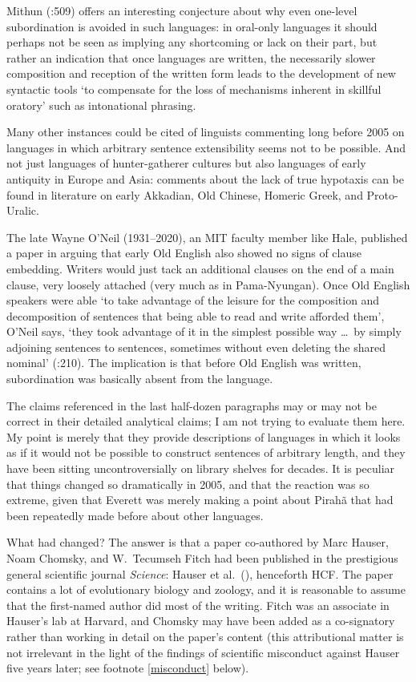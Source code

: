 \documentclass[output=paper,colorlinks,citecolor=brown
]{langscibook}
\begin{document}
Mithun (\citeyear{Mithun84}:509) offers an interesting conjecture
about why even one-level subordination is avoided in such languages:
in oral-only languages it should perhaps not be seen as implying any
shortcoming or lack on their part, but rather an indication that once
languages are written, the necessarily slower composition and reception
of the written form leads to the development of new syntactic tools
`to compensate for the loss of mechanisms inherent in skillful oratory'
such as intonational phrasing.

Many other instances could be cited of linguists commenting long before
2005 on languages in which arbitrary sentence extensibility seems not
to be possible. And not just languages of hunter-gatherer cultures
but also languages of early antiquity in Europe and Asia: comments
about the lack of true hypotaxis can be found in literature on
early Akkadian, Old Chinese, Homeric Greek, and Proto-Uralic.

The late Wayne O'Neil (1931--2020), an MIT faculty member like Hale,
published a paper in \citeyear{ONeil77} arguing that early Old English
also showed no signs of clause embedding. Writers would just tack an
additional clauses on the end of a main clause, very loosely attached
(very much as in Pama-Nyungan). Once Old English speakers were able
`to take advantage of the leisure for the composition and decomposition
of sentences that being able to read and write afforded them', O'Neil
says, `they took advantage of it in the simplest possible way \ldots\
by simply adjoining sentences to sentences, sometimes without even
deleting the shared nominal' (\citealt{ONeil77}:210). The implication
is that before Old English was written, subordination was basically
absent from the language.

The claims referenced in the last half-dozen paragraphs may or may not
be correct in their detailed analytical claims; I am not trying to
evaluate them here. My point is merely that they provide descriptions
of languages in which it looks as if it would not be possible to
construct sentences of arbitrary length, and they have been sitting
uncontroversially on library shelves for decades. It is peculiar that
things changed so dramatically in 2005, and that the reaction was so
extreme, given that Everett was merely making a point about Pirah{\~a}
that had been repeatedly made before about other languages.

What had changed? The answer is that a paper co-authored by Marc
Hauser, Noam Chomsky, and W.\ Tecumseh Fitch had been published in
the prestigious general scientific journal \textit{Science}: Hauser
et al.\ (\citeyear{HauChoFit02}), henceforth HCF. The paper contains
a lot of evolutionary biology and zoology, and it is reasonable to
assume that the first-named author did most of the writing. Fitch was
an associate in Hauser's lab at Harvard, and Chomsky may have been
added as a co-signatory rather than working in detail on the paper's
content (this attributional matter is not irrelevant in the light of
the findings of scientific misconduct against Hauser five years later;
see footnote \ref{misconduct} below).
\end{document}
